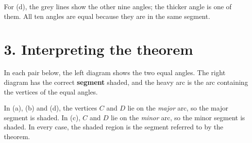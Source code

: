 \documentclass[11pt,a4paper]{article}
\def\PairLeftX{-6.8}
\def\PairRightShift{6.6}
\def\ShadedTheoremPair#1#2#3#4#5#6#7#8#9{%
  \begin{scope}[shift={(\PairLeftX,#1)}]
    \node[anchor=west, font=\bfseries] at (-0.2-#2, #2+0.7) {#7};
    \draw[circleline] (0,0) circle (#2);
    \coordinate (A) at ({#2*cos(#3)}, {#2*sin(#3)});
    \coordinate (B) at ({#2*cos(#4)}, {#2*sin(#4)});
    \coordinate (C) at ({#2*cos(#5)}, {#2*sin(#5)});
    \coordinate (D) at ({#2*cos(#6)}, {#2*sin(#6)});
    \draw[chord] (A)--(B);
    \draw (A)--(C)--(B);
    \draw (A)--(D)--(B);
    \pic[draw, angle eccentricity=1.2, angle radius=0.5cm] {angle=A--C--B};
    \pic[draw, angle eccentricity=1.2, angle radius=0.5cm] {angle=A--D--B};
    \fill (A) circle (1pt);
    \fill (B) circle (1pt);
    \fill (C) circle (1pt);
    \fill (D) circle (1pt);
    \node[labelAB, below right=1pt of A] {\(A\)};
    \node[labelAB, below left=1pt of B] {\(B\)};
    \node[labelAB, above right=1pt of C] {\(C\)};
    \node[labelAB, above left=1pt of D] {\(D\)};
  \end{scope}
  \begin{scope}[shift={({\PairLeftX + \PairRightShift},#1)}]
    \coordinate (A2) at ({#2*cos(#3)}, {#2*sin(#3)});
    \coordinate (B2) at ({#2*cos(#4)}, {#2*sin(#4)});
    \coordinate (S) at ({#2*cos(#8)}, {#2*sin(#8)});
    \coordinate (E) at ({#2*cos(#8+#9)}, {#2*sin(#8+#9)});
    \fill[segmentblue] (S) arc[start angle=#8, delta angle=#9, radius=#2] -- (E) -- cycle;
    \draw[circleline] (0,0) circle (#2);
    \draw[very thick] (S) arc[start angle=#8, delta angle=#9, radius=#2];
    \draw[chord] (A2)--(B2);
    \fill (A2) circle (1pt);
    \fill (B2) circle (1pt);
    \node[labelAB, below right=1pt of A2] {\(A\)};
    \node[labelAB, below left=1pt of B2] {\(B\)};
  \end{scope}
}
\begin{document}
For (d), the grey lines show the other nine angles; the thicker angle is one of them. All ten angles are equal because they are in the same segment.

\newpage

\section*{3. Interpreting the theorem}

In each pair below, the left diagram shows the two equal angles.  
The right diagram has the correct \textbf{segment} shaded, and the heavy arc is the arc containing the vertices of the equal angles.

\begin{center}
\end{center}

In (a), (b) and (d), the vertices \(C\) and \(D\) lie on the \emph{major} arc, so the major segment is shaded.  
In (c), \(C\) and \(D\) lie on the \emph{minor} arc, so the minor segment is shaded.  
In every case, the shaded region is the segment referred to by the theorem.
\end{document}
